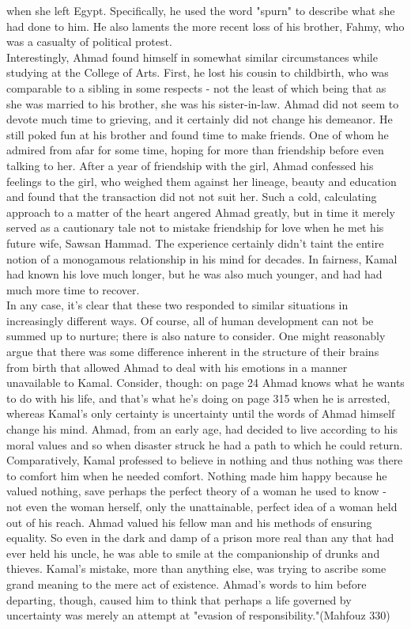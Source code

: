 \documentclass[a4paper,12pt]{article}
\providecommand{\mhfz}[1]{(Mahfouz #1)}
\begin{document}
when she left Egypt. Specifically, he used the word "spurn" to describe what
she had done to him. He also laments the more recent loss of his brother,
Fahmy, who was a casualty of political protest.\\
\indent Interestingly, Ahmad found himself in somewhat similar circumstances
while studying at the College of Arts. First, he lost his cousin to childbirth,
who was comparable to a sibling in some respects - not the least of which being
that as she was married to his brother, she was his sister-in-law. Ahmad did
not seem to devote much time to grieving, and it certainly did not
change his demeanor. He still poked fun at his brother and found time to make
friends. One of whom he admired from afar for some time, hoping for more
than friendship before even talking to her. After a year of friendship with
the girl, Ahmad confessed his feelings to the girl, who weighed them against
her lineage, beauty and education and found that the transaction did not not
suit her. Such a cold, calculating approach to a matter of the heart angered
Ahmad greatly, but in time it merely served as a cautionary tale not to mistake
friendship for love when he met his future wife, Sawsan Hammad. The experience
certainly didn't taint the entire notion of a monogamous relationship in his
mind for decades. In fairness, Kamal had known his love much longer, but he was
also much younger, and had had much more time to recover.\\
\indent In any case, it's clear that these two responded to similar situations
in increasingly different ways. Of course, all of human development can not be
summed up to nurture; there is also nature to consider. One might reasonably
argue that there was some difference inherent in the structure of their brains
from birth that allowed Ahmad to deal with his emotions in a manner unavailable
to Kamal. Consider, though: on page 24 Ahmad knows what he wants to do with his
life, and that's what he's doing on page 315 when he is arrested, whereas
Kamal's only certainty is uncertainty until the words of Ahmad himself change
his mind. Ahmad, from an early age, had decided to live according to his moral
values and so when disaster struck he had a path to which he could return.
Comparatively, Kamal professed to believe in nothing and thus nothing was there
to comfort him when he needed comfort. Nothing made him happy because he valued
nothing, save perhaps the perfect theory of a woman he used to know - not even
the woman herself, only the unattainable, perfect idea of a woman held out of
his reach. Ahmad valued his fellow man and his methods of ensuring equality. So
even in the dark and damp of a prison more real than any that had ever held his
uncle, he was able to smile at the companionship of drunks and thieves. Kamal's
mistake, more than anything else, was trying to ascribe some grand meaning to
the mere act of existence. Ahmad's words to him before departing, though,
caused him to think that perhaps a life governed by uncertainty was merely an
attempt at "evasion of responsibility."\mhfz{330}
\end{document}
